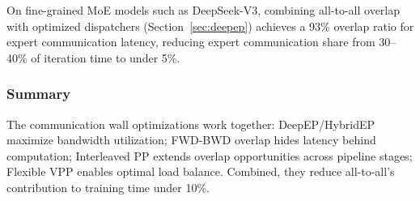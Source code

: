 \documentclass[10pt,logo,copyright]{nvidiatechreport}
\begin{document}
On fine-grained MoE models such as DeepSeek-V3, combining all-to-all overlap with optimized dispatchers (Section~\ref{sec:deepep}) achieves a 93\% overlap ratio for expert communication latency, reducing expert communication share from 30--40\% of iteration time to under 5\%.






\subsubsection{Summary}
The communication wall optimizations work together: DeepEP/HybridEP maximize bandwidth utilization; FWD-BWD overlap hides latency behind computation; Interleaved PP extends overlap opportunities across pipeline stages; Flexible VPP enables optimal load balance. Combined, they reduce all-to-all's contribution to training time under 10\%.
\end{document}
